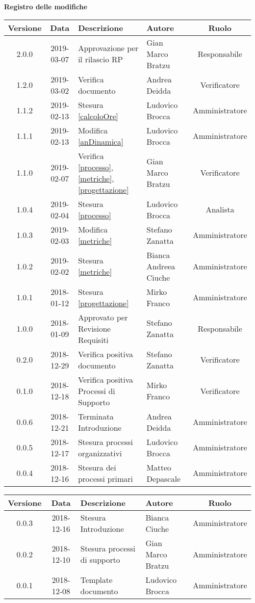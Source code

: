 \begin{center}
	\textbf{Registro delle modifiche}
	\end{center}
	\begin{center}
		\begin{tabularx}{\textwidth}{|c|c|X|X|c|}
			\hline
			\textbf{Versione} & \textbf{Data} & \textbf{Descrizione} & \textbf{Autore} & \textbf{Ruolo} \\
			\hline
			2.0.0 &2019-03-07 & Approvazione per il rilascio RP & Gian Marco Bratzu& Responsabile\\
			\hline
			1.2.0 &2019-03-02 & Verifica documento &Andrea Deidda& Verificatore\\
			\hline
			1.1.2 &2019-02-13 &Stesura \ref{calcoloOre} &Ludovico Brocca& Amministratore\\
			\hline
			1.1.1 &2019-02-13 &Modifica \ref{anDinamica} &Ludovico Brocca& Amministratore\\
			\hline
			1.1.0 &2019-02-07 &Verifica \ref{processo}, \ref{metriche}, \ref{progettazione} &Gian Marco Bratzu& Verificatore\\
			\hline
			1.0.4 &2019-02-04&Stesura \ref{processo}&Ludovico Brocca& Analista\\
			\hline
			1.0.3 & 2019-02-03 & Modifica \ref{metriche} & Stefano Zanatta & Amministratore\\
			\hline
			1.0.2 & 2019-02-02 & Stesura \ref{metriche} & Bianca Andreea Ciuche & Amministratore\\
			\hline
			1.0.1 & 2018-01-12 & Stesura \ref{progettazione} & Mirko Franco & Amministratore \\
			\hline
			1.0.0 & 2018-01-09 & Approvato per Revisione Requisiti & Stefano Zanatta & Responsabile\\
			\hline
			0.2.0 & 2018-12-29 & Verifica positiva documento & Stefano Zanatta & Verificatore\\
			\hline
			0.1.0 & 2018-12-18 & Verifica positiva Processi di Supporto & Mirko Franco & Verificatore\\
			\hline
			0.0.6 & 2018-12-21 & Terminata Introduzione & Andrea Deidda & Amministratore\\
			\hline
			0.0.5 & 2018-12-17 & Stesura processi organizzativi & Ludovico Brocca & Amministratore\\
			\hline
			0.0.4 & 2018-12-16 & Stesura dei processi primari & Matteo Depascale & Amministratore\\
			\hline
		\end{tabularx}
	\begin{tabularx}{\textwidth}{|c|c|X|X|c|}
		\hline
		\textbf{Versione} & \textbf{Data} & \textbf{Descrizione} & \textbf{Autore} & \textbf{Ruolo} \\
		\hline
		0.0.3 & 2018-12-16 & Stesura Introduzione & Bianca Ciuche & Amministratore\\
		\hline
		0.0.2 & 2018-12-10 & Stesura processi di supporto & Gian Marco Bratzu & Amministratore\\	
		\hline
		0.0.1 & 2018-12-08 & Template documento  & Ludovico Brocca & Amministratore\\
		\hline
	\end{tabularx}
	\end{center}

\newpage